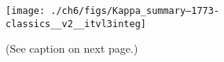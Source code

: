   \begin{figure}
    \centering
    \noindent\texttt{[image: ./ch6/figs/Kappa\_summary--1773-classics\_\_v2\_\_itvl3integ]}
    \caption[Inverted V precipitation and best-fit Maxwellian and kappa
    distribution parameters (Orbit 1773)]{(See caption on next page.)}
    \label{ch6:Fig1}
  \end{figure}
